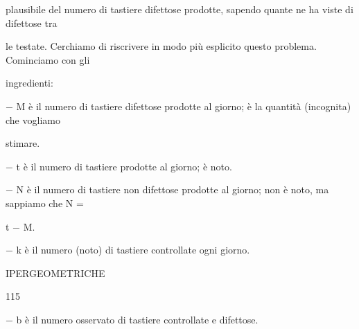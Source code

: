 \documentclass[a4paper,portrait,12pt]{article}
\begin{document}
\begin{flushleft}
plausibile del numero di tastiere difettose prodotte, sapendo quante ne ha viste di difettose tra
\end{flushleft}


\begin{flushleft}
le testate. Cerchiamo di riscrivere in modo più esplicito questo problema. Cominciamo con gli
\end{flushleft}


\begin{flushleft}
ingredienti:
\end{flushleft}


\begin{flushleft}
$-$ M \`{e} il numero di tastiere difettose prodotte al giorno; \`{e} la quantit\`{a} (incognita) che vogliamo
\end{flushleft}


\begin{flushleft}
stimare.
\end{flushleft}


\begin{flushleft}
$-$ t \`{e} il numero di tastiere prodotte al giorno; \`{e} noto.
\end{flushleft}


\begin{flushleft}
$-$ N \`{e} il numero di tastiere non difettose prodotte al giorno; non \`{e} noto, ma sappiamo che N =
\end{flushleft}


\begin{flushleft}
t $-$ M.
\end{flushleft}


\begin{flushleft}
$-$ k \`{e} il numero (noto) di tastiere controllate ogni giorno.
\end{flushleft}





\begin{flushleft}
 IPERGEOMETRICHE
\end{flushleft}





115





\begin{flushleft}
$-$ b \`{e} il numero osservato di tastiere controllate e difettose.
\end{flushleft}
\end{document}
